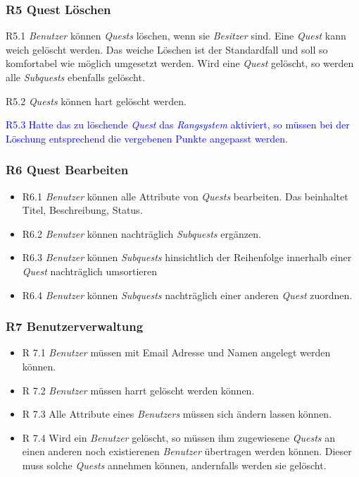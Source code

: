 \documentclass{article}
\begin{document}
\subsubsection{R5 Quest Löschen}

\begin{itemize}
	\item{R5.1} \textit{Benutzer} können \textit{Quests} löschen, wenn sie \textit{Besitzer} sind. Eine \textit{Quest} kann weich gelöscht werden. Das weiche Löschen ist der Standardfall und soll so komfortabel wie möglich umgesetzt werden. Wird eine  \textit{Quest}  gelöscht, so werden alle  \textit{Subquests} ebenfalls gelöscht.
	\item{R5.2} \textit{Quests} können hart gelöscht werden.
	\textcolor{blue}{\item{R5.3} Hatte das zu löschende \textit{Quest} das \textit{Rangsystem} aktiviert, so müssen bei der Löschung entsprechend die vergebenen Punkte angepasst werden.}
\end{itemize}

\subsubsection{R6 Quest Bearbeiten}

\begin{itemize}
	\item{R6.1} \textit{Benutzer} können alle Attribute von \textit{Quests} bearbeiten. Das beinhaltet Titel, Beschreibung, Status.
	\item{R6.2} \textit{Benutzer} können nachträglich \textit{Subquests} ergänzen.
	\item{R6.3} \textit{Benutzer} können \textit{Subquests} hinsichtlich der Reihenfolge innerhalb einer \textit{Quest} nachträglich umsortieren
	\item{R6.4} \textit{Benutzer} können \textit{Subquests} nachträglich einer anderen \textit{Quest} zuordnen.
\end{itemize}

\subsubsection{R7 Benutzerverwaltung}
    \begin{itemize}
        \item{R 7.1} \textit{Benutzer} müssen mit Email Adresse und Namen angelegt werden können.
        \item{R 7.2} \textit{Benutzer} müssen harrt gelöscht werden können.
        \item{R 7.3} Alle Attribute eines \textit{Benutzers} müssen sich ändern lassen können.
        \item{R 7.4} Wird ein \textit{Benutzer} gelöscht, so müssen ihm zugewiesene \textit{Quests} an einen anderen noch existierenen \textit{Benutzer} übertragen werden können. Dieser muss solche \textit{Quests} annehmen können, andernfalls werden sie gelöscht. 
    \end{itemize}
\end{document}
